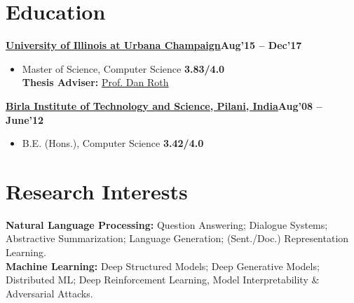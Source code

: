 \documentclass[margin,line]{templates/resume}
\newcommand{\compresslist}{%
\setlength{\itemsep}{3pt}%
\setlength{\parskip}{0pt}%
\setlength{\parsep}{0pt}%
}
\begin{document}
\begin{resume}
\section{\mysidestyle Education}
    \textbf{\href{https://cs.illinois.edu/}{University of Illinois at Urbana Champaign}}\hfill {\textbf{Aug'15 -- Dec'17}}
    \begin{itemize}[leftmargin=*]\compresslist
        \item[]Master of Science, Computer Science \hfill {\textbf{3.83/4.0}}\\
    \textbf{Thesis Adviser:} \href{http://www.cis.upenn.edu/~danroth/}{Prof. Dan Roth}
    \end{itemize}
    \vspace{-0.2cm}
    \textbf{\href{http://www.bits-pilani.ac.in/}{Birla Institute of Technology and Science, Pilani, India}}\hfill{\textbf{Aug'08 -- June'12}}
    \begin{itemize}[leftmargin=*]\compresslist
        \item[]B.E. (Hons.), Computer Science \hfill{\textbf{3.42/4.0}}
    \end{itemize}

\vspace{-0.1cm}    
\section{\mysidestyle Research Interests}


\textbf{Natural Language Processing:} Question Answering; Dialogue Systems; Abstractive Summarization; Language Generation; (Sent./Doc.) Representation Learning. \\
\textbf{Machine Learning:} Deep Structured Models; Deep Generative Models; Distributed ML; Deep Reinforcement Learning, Model Interpretability \& Adversarial Attacks.


\end{resume}
\end{document}
